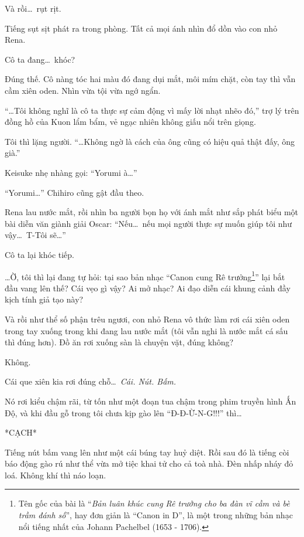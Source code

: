 \documentclass[../main.tex]{subfiles}
\begin{document}
Và rồi\dots\ rụt rịt.

Tiếng sụt sịt phát ra trong phòng. Tất cả mọi ánh nhìn đổ dồn vào con nhỏ Rena.

Cô ta đang\dots\ khóc?

Đúng thế. Cô nàng tóc hai màu đó đang dụi mắt, môi mím chặt, còn tay thì vẫn cầm xiên oden. Nhìn vừa tội vừa ngớ ngẩn.


``\dots Tôi không nghĩ là cô ta thực sự cảm động vì mấy lời nhạt nhẽo đó,'' trợ lý trên đồng hồ của Kuon lẩm bẩm, vẻ ngạc nhiên không giấu nổi trên giọng.

Tôi thì lặng người. ``\dots Không ngờ là cách của ông cũng có hiệu quả thật đấy, ông già.''

Keisuke nhẹ nhàng gọi: ``Yorumi à\dots''

``Yorumi\dots'' Chihiro cũng gật đầu theo.

Rena lau nước mắt, rồi nhìn ba người bọn họ với ánh mắt như sắp phát biểu một bài diễn văn giành giải Oscar: ``Nếu\dots\ nếu mọi người thực sự muốn giúp tôi như vậy\dots\ T-Tôi sẽ\dots''

Cô ta lại khóc tiếp.

\dots Ờ, tôi thì lại đang tự hỏi: tại sao bản nhạc ``Canon cung Rê trưởng\footnote{Tên gốc của bài là ``\textit{Bản luân khúc cung Rê trưởng cho ba đàn vĩ cầm và bè trầm đánh số}'', hay đơn giản là ``Canon in D'', là một trong những bản nhạc nổi tiếng nhất của Johann Pachelbel (1653 - 1706).}'' lại bắt đầu vang lên thế? Cái vẹo gì vậy? Ai mở nhạc? Ai đạo diễn cái khung cảnh đầy kịch tính giả tạo này?

Và rồi như thể số phận trêu ngươi, con nhỏ Rena vô thức làm rơi cái xiên oden trong tay xuống trong khi đang lau nước mắt (tôi vẫn nghi là nước mắt cá sấu thì đúng hơn). Đồ ăn rơi xuống sàn là chuyện vặt, đúng không?

Không.

Cái que xiên kia rơi đúng chỗ\dots\ \emph{Cái. Nút. Bấm.}

Nó rơi kiểu chậm rãi, từ tốn như một đoạn tua chậm trong phim truyền hình Ấn Độ, và khi đầu gỗ trong tôi chưa kịp gào lên ``Đ-Đ-Ừ-N-G!!!'' thì\dots

*CẠCH*

Tiếng nút bấm vang lên như một cái búng tay huỷ diệt. Rồi sau đó là tiếng còi báo động gào rú như thể vừa mở tiệc khai tử cho cả toà nhà. Đèn nhấp nháy đỏ loá. Không khí thì náo loạn.

\end{document}
